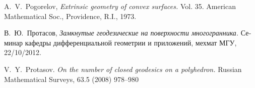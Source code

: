 \documentclass[oneside,a4paper, 12pt]{article}
\begin{document}
\begin{thebibliography}{52}
A.~V.~Pogorelov, \emph{Extrinsic geometry of convex surfaces.} 
Vol. 35. American Mathematical Soc., Providence, R.I., 1973.

\begin{otherlanguage}{russian}
В.~Ю.~Протасов,
\emph{Замкнутые геодезические на поверхности многогранника.}
Семинар кафедры дифференциальной геометрии и приложений, мехмат МГУ, 22/10/2012.
\end{otherlanguage}


V.~Y.~Protasov.
\newblock \emph{On the number of closed geodesics on a polyhedron.}
\newblock Russian Mathematical Surveys, 63.5 (2008) 978--980


\end{thebibliography}
\Addresses
\end{document}
